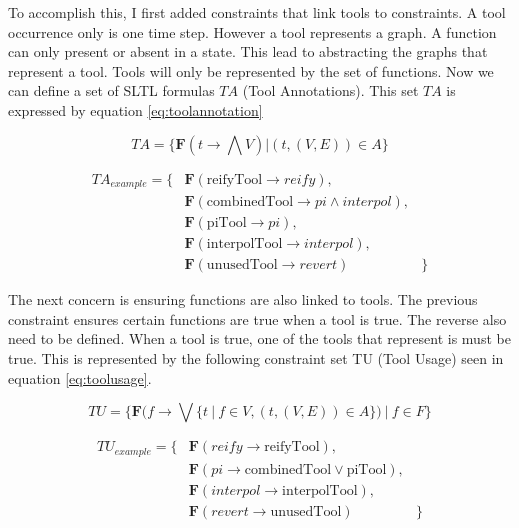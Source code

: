 \documentclass{article}
\begin{document}
To accomplish this, I first added constraints that link tools to constraints. A tool occurrence only is one time step. However a tool represents a graph. A function can only present or absent in a state. This lead to abstracting the graphs that represent a tool. Tools will only be represented by the set of functions. Now we can define a set of SLTL formulas $TA$ (Tool Annotations). This set $TA$ is expressed by equation \ref{eq:toolannotation} 

\begin{equation}
    TA = \{ \textbf{F}(t \rightarrow \bigwedge V) | (t,(V,E))  \in A \} \label{eq:toolannotation}
\end{equation}

\begin{align*}
    TA_{example} = \{& \textbf{F}( \text{reifyTool} \rightarrow reify), &\\
    & \textbf{F}( \text{combinedTool} \rightarrow pi \wedge interpol), &\\
    & \textbf{F}( \text{piTool} \rightarrow pi), &\\
    & \textbf{F}( \text{interpolTool} \rightarrow interpol), &\\
    &\textbf{F}( \text{unusedTool} \rightarrow revert) & \}
\end{align*}

The next concern is ensuring functions are also linked to tools. The previous constraint ensures certain functions are true when a tool is true. The reverse also need to be defined. When a tool is true, one of the tools that represent is must be true. This is represented by the following constraint set TU (Tool Usage) seen in equation \ref{eq:toolusage}.

\begin{equation}
    TU =  \{  \textbf{F} ( f \rightarrow \bigvee \{ t\ |\ f \in V, (t,(V,E))  \in A  \} )\ |\ f \in F \} \label{eq:toolusage}
\end{equation}

\begin{align*}
    TU_{example}= \{&\textbf{F} (reify \rightarrow \text{reifyTool}), &\\
    &\textbf{F} (pi \rightarrow \text{combinedTool} \vee \text{piTool}), &\\
    &\textbf{F} (interpol  \rightarrow \text{interpolTool}),& \\
    &\textbf{F} (revert  \rightarrow \text{unusedTool}) &\} 
\end{align*}
\end{document}
